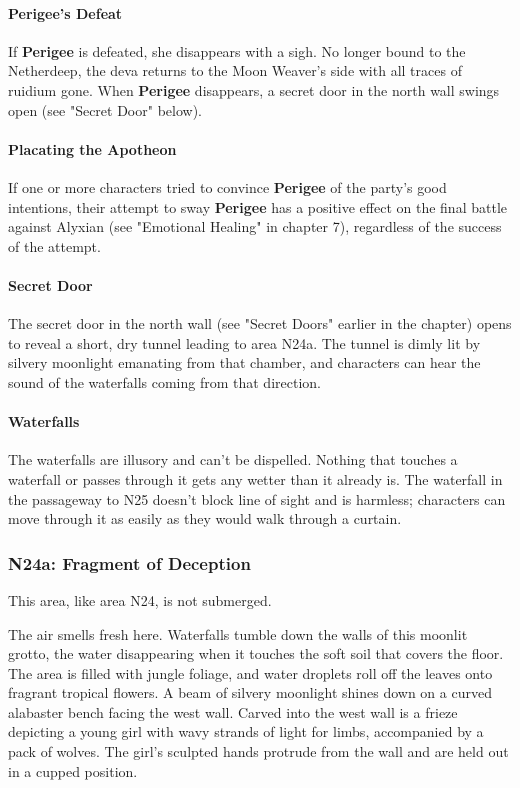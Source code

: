 \documentclass[10pt,a4,twoside,twocolumn,openany,nodeprecatedcode]{dndbook}
\begin{document}
\paragraph{Perigee's Defeat}
If \textbf{Perigee} is defeated, she disappears with a sigh. No longer bound to the Netherdeep, the deva returns to the Moon Weaver's side with all traces of ruidium gone. When \textbf{Perigee} disappears, a secret door in the north wall swings open (see "Secret Door" below).
\paragraph{Placating the Apotheon}
If one or more characters tried to convince \textbf{Perigee} of the party's good intentions, their attempt to sway \textbf{Perigee} has a positive effect on the final battle against Alyxian (see "Emotional Healing" in chapter 7), regardless of the success of the attempt.
\paragraph{Secret Door}
The secret door in the north wall (see "Secret Doors" earlier in the chapter) opens to reveal a short, dry tunnel leading to area N24a. The tunnel is dimly lit by silvery moonlight emanating from that chamber, and characters can hear the sound of the waterfalls coming from that direction.
\paragraph{Waterfalls}
The waterfalls are illusory and can't be dispelled. Nothing that touches a waterfall or passes through it gets any wetter than it already is. The waterfall in the passageway to N25 doesn't block line of sight and is harmless; characters can move through it as easily as they would walk through a curtain.
\subsubsection{N24a: Fragment of Deception}
This area, like area N24, is not submerged.
\begin{DndReadAloud}{}
The air smells fresh here. Waterfalls tumble down the walls of this moonlit grotto, the water disappearing when it touches the soft soil that covers the floor. The area is filled with jungle foliage, and water droplets roll off the leaves onto fragrant tropical flowers.
A beam of silvery moonlight shines down on a curved alabaster bench facing the west wall. Carved into the west wall is a frieze depicting a young girl with wavy strands of light for limbs, accompanied by a pack of wolves. The girl's sculpted hands protrude from the wall and are held out in a cupped position.
\end{DndReadAloud}
\end{document}
